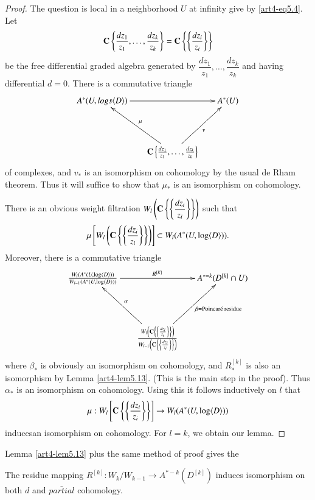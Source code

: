 \begin{proof}
The question is local in a neighborhood $U$ at infinity give by \eqref{art4-eq5.4}. Let
$$
\mathbf{C} \left\{\frac{dz_1}{z_1}, \ldots, \frac{dz_k}{z_k} \right\} = \mathbf{C} \left\{ \left\{\frac{dz_i}{z_i} \right\} \right\}
$$
be the free differential graded algebra generated by $\dfrac{dz_1}{z_1} ,\ldots,\dfrac{dz_k}{z_k}$ and having differential $d=0$. There is a commutative triangle
$$
\xymatrix@R=1.5cm@C=.6cm{
A^\ast (U, logs \langle D \rangle) \ar[rr] && A^\ast (U)\\
& \bC \left\{\frac{dz_1}{z_1} , \ldots , \frac{dz_k}{z_k} \right\}  \ar[ur]_v \ar[ul]_{\mu} &
}
$$
\pageoriginale
of complexes, and $v_\ast$ is an isomorphism on cohomology by the usual de Rham theorem. Thus it will suffice to show that $\mu_{\ast}$ is an isomorphism on cohomology.

There is an obvious weight filtration $W_l \left(\mathbf{C} \left\{\left\{\dfrac{dz_i}{z_i} \right\} \right\} \right)$ such that 
$$
\mu \left[W_l \left(\mathbf{C}\left\{ \left\{ \frac{dz_i}{z_i}\right\}  \right\}\right) \right] \subset W_l (A^\ast (U, \log \langle D \rangle)).
$$
Moreover, there is a commutative triangle
$$
\xymatrix@R=1.5cm@C=.6cm{
\frac{W_l (A^\ast (U, \log \langle D \rangle))}{W_{l-1} (A^\ast (U, \log \langle D \rangle))}  \ar[rr]^-{R^{[K]}} && A^{\ast =k } (D^{[k]} \cap U)\\
& \frac{W_l \left(\bC \left\{ \left\{ \frac{dz_i}{z_i} \right\} \right\}\right)}{W_{l-1} \left(\bC \left\{ \left\{ \frac{dz_i}{z_i}  \right\} \right\} \right)} \ar[ur]_-{\beta = \text{Poincar\'e residue}} \ar[ul]_-{\alpha} & 
}
$$
where $\beta_\ast$ is obviously an isomorphism on cohomology, and $R^{[k]}_\ast$ is also an isomorphism by Lemma \eqref{art4-lem5.13}. (This is the main step in the proof). Thus $\alpha_\ast$ is an isomorphism on cohomology. Using this it follows inductively on $l$ that
$$
\mu : W_l \left[ \mathbf{C} \left\{ \left\{ \frac{dz_i}{z_i} \right\} \right\} \right] \to W_l (A^\ast (U, \log \langle D \rangle))
$$
induces\pageoriginale an isomorphism on cohomology. For $l=k$, we obtain our lemma.
\end{proof}

\begin{remark*}
Lemma \ref{art4-lem5.13} plus the same method of proof gives the 
\end{remark*}

\setcounter{coro}{14}
\begin{coro}\label{art4-coro5.15}
The residue mapping $R^{[k]} : W_k / W_{k-1} \to A^{\ast -k} (D^{[k]})$ induces isomorphism on both $d$ and $\bar{partial}$ cohomology.
\end{coro}

